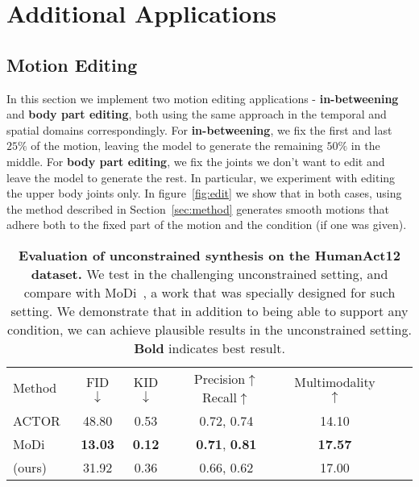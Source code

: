 \vspace{-5pt}
\section{Additional Applications}
\vspace{-5pt}
\subsection{Motion Editing} \label{sec:edit}
\vspace{-5pt}

In this section we implement two motion editing applications - \textbf{in-betweening} and \textbf{body part editing}, both using the same approach in the temporal and spatial domains correspondingly. 
For \textbf{in-betweening}, we fix the first and last $25\%$ of the motion, leaving the model to generate the remaining $50\%$ in the middle. For \textbf{body part editing}, we fix the joints we don't want to edit and leave the model to generate the rest. In particular, we experiment with editing the upper body joints only.
In figure~\ref{fig:edit} we show that in both cases, using the method described in Section~\ref{sec:method} generates smooth motions that adhere both to the fixed part of the motion and the condition (if one was given).




\begin{table}[tbh]
\centering


\small

    \begin{tabular}{lcccccc}
    \toprule
    
    \multirow{2}{2cm}{\centering Method} & 
    \multirow{2}{1.5cm}{\centering FID$\downarrow$} &
    \multirow{2}{2cm}{\centering KID$\downarrow$} &
    \multirow{2}{2cm}{\centering Precision$\uparrow$ Recall$\uparrow$} &
    \multirow{2}{2cm}{\centering Multimodality$\uparrow$} \\
    \\

    \midrule

    ACTOR~\citeyearpar{petrovich21actor} & 48.80 & 0.53 & 0.72,   0.74 & 14.10 \\ 

    MoDi~\citeyearpar{raab2022modi} & \textbf{13.03} & \textbf{0.12} & \textbf{0.71},   \textbf{0.81} & \textbf{17.57}\\ 
    
    \midrule

    \ourmethod{} (ours)  & 31.92 & 0.36 & 0.66, 0.62 & 17.00\\  

    \bottomrule
    \end{tabular}
\caption{\textbf{Evaluation of unconstrained synthesis on the HumanAct12 dataset.} We test \ourmethod{} in the challenging unconstrained setting, and compare with MoDi~\citep{raab2022modi}, a work that was specially designed for such setting. We demonstrate that in addition to being able to support any condition, we can achieve plausible results in the unconstrained setting.
\textbf{Bold} indicates best result.}
\label{tab:unconstrained}
\end{table}
 \vspace{-5pt}
